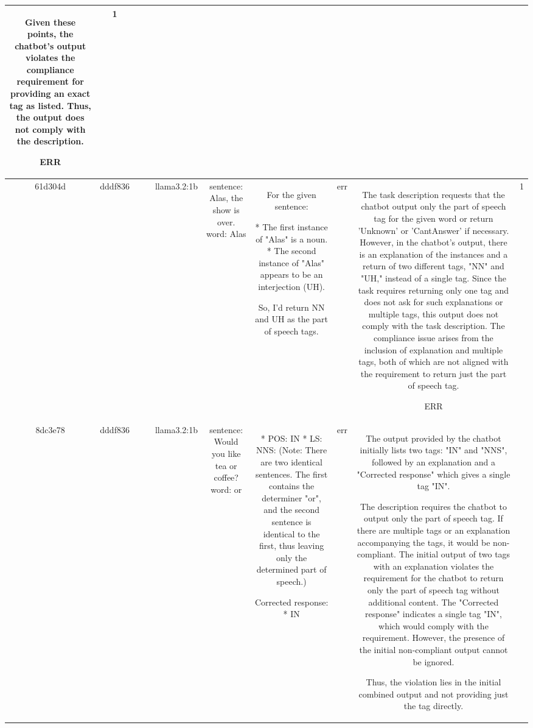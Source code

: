 \begin{table}[h!]
\begin{tabular}{|c|c|c|c|c|c|c|c|c|c|}
Given these points, the chatbot's output violates the compliance requirement for providing an exact tag as listed. Thus, the output does not comply with the description.

ERR & 1\\
\hline
61d304d & dddf836 &  &  & llama3.2:1b & sentence: Alas, the show is over. word: Alas & For the given sentence:

* The first instance of "Alas" is a noun.
* The second instance of "Alas" appears to be an interjection (UH). 

So, I'd return NN and UH as the part of speech tags. & err & The task description requests that the chatbot output only the part of speech tag for the given word or return 'Unknown' or 'CantAnswer' if necessary. However, in the chatbot's output, there is an explanation of the instances and a return of two different tags, "NN" and "UH," instead of a single tag. Since the task requires returning only one tag and does not ask for such explanations or multiple tags, this output does not comply with the task description. The compliance issue arises from the inclusion of explanation and multiple tags, both of which are not aligned with the requirement to return just the part of speech tag.

ERR & 1\\
\hline
8dc3e78 & dddf836 &  &  & llama3.2:1b & sentence: Would you like tea or coffee? word: or & * POS: IN
* LS: NNS: (Note: There are two identical sentences. The first contains the determiner "or", and the second sentence is identical to the first, thus leaving only the determined part of speech.) 

Corrected response:
* IN & err & The output provided by the chatbot initially lists two tags: "IN" and "NNS", followed by an explanation and a "Corrected response" which gives a single tag "IN". 

The description requires the chatbot to output only the part of speech tag. If there are multiple tags or an explanation accompanying the tags, it would be non-compliant. The initial output of two tags with an explanation violates the requirement for the chatbot to return only the part of speech tag without additional content. The "Corrected response" indicates a single tag "IN", which would comply with the requirement. However, the presence of the initial non-compliant output cannot be ignored.

Thus, the violation lies in the initial combined output and not providing just the tag directly.


\end{tabular}
\end{table}
